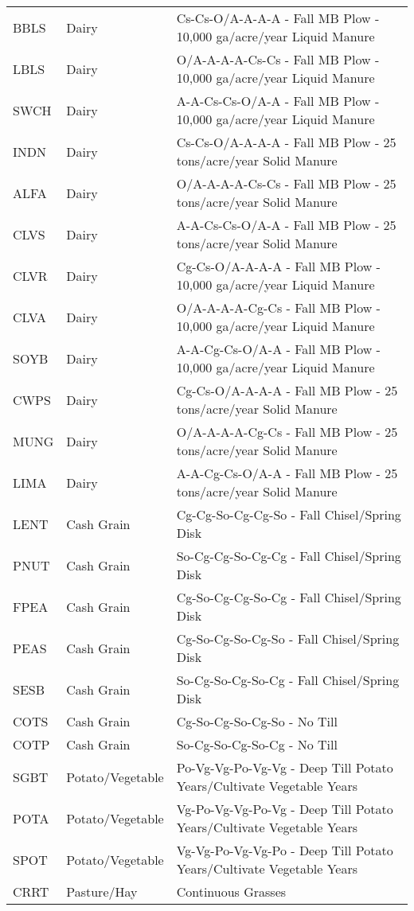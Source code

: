 \begin{landscape}
\begin{longtable}{l l l}
  BBLS & Dairy & Cs-Cs-O/A-A-A-A - Fall MB Plow - 10,000 ga/acre/year Liquid Manure \\ 
  LBLS & Dairy & O/A-A-A-A-Cs-Cs - Fall MB Plow - 10,000 ga/acre/year Liquid Manure \\ 
  SWCH & Dairy & A-A-Cs-Cs-O/A-A - Fall MB Plow - 10,000 ga/acre/year Liquid Manure \\ 
  INDN & Dairy & Cs-Cs-O/A-A-A-A - Fall MB Plow - 25 tons/acre/year Solid Manure \\ 
  ALFA & Dairy & O/A-A-A-A-Cs-Cs - Fall MB Plow - 25 tons/acre/year Solid Manure \\ 
  CLVS & Dairy & A-A-Cs-Cs-O/A-A - Fall MB Plow - 25 tons/acre/year Solid Manure \\ 
  CLVR & Dairy & Cg-Cs-O/A-A-A-A - Fall MB Plow - 10,000 ga/acre/year Liquid Manure \\ 
  CLVA & Dairy & O/A-A-A-A-Cg-Cs - Fall MB Plow - 10,000 ga/acre/year Liquid Manure \\ 
  SOYB & Dairy & A-A-Cg-Cs-O/A-A - Fall MB Plow - 10,000 ga/acre/year Liquid Manure \\ 
  CWPS & Dairy & Cg-Cs-O/A-A-A-A - Fall MB Plow - 25 tons/acre/year Solid Manure \\ 
  MUNG & Dairy & O/A-A-A-A-Cg-Cs - Fall MB Plow - 25 tons/acre/year Solid Manure \\ 
  LIMA & Dairy & A-A-Cg-Cs-O/A-A - Fall MB Plow - 25 tons/acre/year Solid Manure \\ 
  LENT & Cash Grain & Cg-Cg-So-Cg-Cg-So - Fall Chisel/Spring Disk \\ 
  PNUT & Cash Grain & So-Cg-Cg-So-Cg-Cg - Fall Chisel/Spring Disk \\ 
  FPEA & Cash Grain & Cg-So-Cg-Cg-So-Cg - Fall Chisel/Spring Disk \\ 
  PEAS & Cash Grain & Cg-So-Cg-So-Cg-So - Fall Chisel/Spring Disk \\ 
  SESB & Cash Grain & So-Cg-So-Cg-So-Cg - Fall Chisel/Spring Disk \\ 
  COTS & Cash Grain & Cg-So-Cg-So-Cg-So - No Till \\ 
  COTP & Cash Grain & So-Cg-So-Cg-So-Cg - No Till \\ 
  SGBT & Potato/Vegetable & Po-Vg-Vg-Po-Vg-Vg - Deep Till Potato Years/Cultivate Vegetable Years \\ 
  POTA & Potato/Vegetable & Vg-Po-Vg-Vg-Po-Vg - Deep Till Potato Years/Cultivate Vegetable Years \\ 
  SPOT & Potato/Vegetable & Vg-Vg-Po-Vg-Vg-Po - Deep Till Potato Years/Cultivate Vegetable Years \\ 
  CRRT & Pasture/Hay & Continuous Grasses
\label{tab:lnd_mgt_def}
\end{longtable}
\end{landscape}